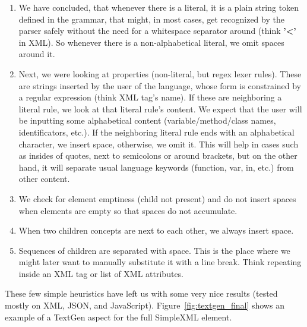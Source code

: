 \begin{enumerate}
	\item We have concluded, that whenever there is a literal, it is a plain string token defined in the grammar, that might, in most cases, get recognized by the parser safely without the need for a whitespace separator around (think \textbf{'\textless'} in XML).
	So whenever there is a non-alphabetical literal, we omit spaces around it.

	\item Next, we were looking at properties (non-literal, but regex lexer rules).
	These are strings inserted by the user of the language, whose form is constrained by a regular expression (think XML tag's name).
	If these are neighboring a literal rule, we look at that literal rule's content.
	We expect that the user will be inputting some alphabetical content (variable/method/class names, identificators, etc.).
	If the neighboring literal rule ends with an alphabetical character, we insert space, otherwise, we omit it.
	This will help in cases such as insides of quotes, next to semicolons or around brackets, but on the other hand, it will separate usual language keywords (function, var, in, etc.) from other content.

	\item We check for element emptiness (child not present) and do not insert spaces when elements are empty so that spaces do not accumulate.

	\item When two children concepts are next to each other, we always insert space.

	\item Sequences of children are separated with space.
	This is the place where we might later want to manually substitute it with a line break.
	Think repeating  inside an XML tag or list of XML attributes.
\end{enumerate}

These few simple heuristics have left us with some very nice results (tested mostly on XML, JSON, and JavaScript). Figure~\ref{fig:textgen_final} shows an example of a TextGen aspect for the full SimpleXML element.
\\

